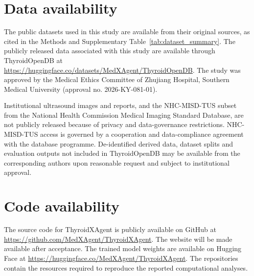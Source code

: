 \documentclass[fleqn,10pt]{wlscirep}
\begin{document}
\section{Data availability}
The public datasets used in this study are available from their original sources, as cited in the Methods and Supplementary Table~\ref{tab:dataset_summary}. The publicly released data associated with this study are available through ThyroidOpenDB at \url{https://huggingface.co/datasets/MedXAgent/ThyroidOpenDB}.
The study was approved by the Medical Ethics Committee of Zhujiang Hospital, Southern Medical University (approval no. 2026-KY-081-01).

Institutional ultrasound images and reports, and the NHC-MISD-TUS subset from the National Health Commission Medical Imaging Standard Database, are not publicly released because of privacy and data-governance restrictions. NHC-MISD-TUS access is governed by a cooperation and data-compliance agreement with the database programme. De-identified derived data, dataset splits and evaluation outputs not included in ThyroidOpenDB may be available from the corresponding authors upon reasonable request and subject to institutional approval.


\section{Code availability}
The source code for ThyroidXAgent is publicly available on GitHub at \url{https://github.com/MedXAgent/ThyroidXAgent}. The website will be made available after acceptance. The trained model weights are available on Hugging Face at \url{https://huggingface.co/MedXAgent/ThyroidXAgent}. The repositories contain the resources required to reproduce the reported computational analyses.
\end{document}
